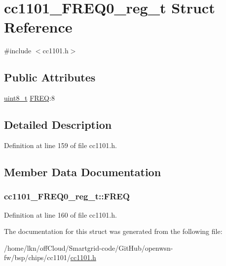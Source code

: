 \hypertarget{structcc1101___f_r_e_q0__reg__t}{}\section{cc1101\+\_\+\+F\+R\+E\+Q0\+\_\+reg\+\_\+t Struct Reference}
\label{structcc1101___f_r_e_q0__reg__t}


{\ttfamily \#include $<$cc1101.\+h$>$}

\subsection*{Public Attributes}
\begin{DoxyCompactItemize}
\item 
\hyperlink{_p_e___types_8h_aba7bc1797add20fe3efdf37ced1182c5}{uint8\+\_\+t} \hyperlink{structcc1101___f_r_e_q0__reg__t_aed649537253f0a006a32529bd56baff9}{F\+R\+EQ}\+:8
\end{DoxyCompactItemize}


\subsection{Detailed Description}


Definition at line 159 of file cc1101.\+h.



\subsection{Member Data Documentation}
\subsubsection[{\texorpdfstring{F\+R\+EQ}{FREQ}}]{ cc1101\+\_\+\+F\+R\+E\+Q0\+\_\+reg\+\_\+t\+::\+F\+R\+EQ}\hypertarget{structcc1101___f_r_e_q0__reg__t_aed649537253f0a006a32529bd56baff9}{}\label{structcc1101___f_r_e_q0__reg__t_aed649537253f0a006a32529bd56baff9}


Definition at line 160 of file cc1101.\+h.



The documentation for this struct was generated from the following file\+:\begin{DoxyCompactItemize}
\item 
/home/lkn/off\+Cloud/\+Smartgrid-\/code/\+Git\+Hub/openwsn-\/fw/bsp/chips/cc1101/\hyperlink{cc1101_8h}{cc1101.\+h}\end{DoxyCompactItemize}
